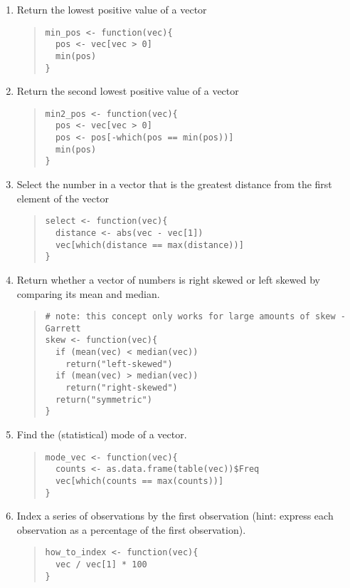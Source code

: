 \documentclass{article}
\begin{document}
\begin{enumerate}
\item Return the lowest positive value of a vector
  \begin{quote}
    \begin{verbatim}
min_pos <- function(vec){
  pos <- vec[vec > 0]
  min(pos)
}    
    \end{verbatim}
  \end{quote}

\item Return the second lowest positive value of a vector
  \begin{quote}
    \begin{verbatim}
min2_pos <- function(vec){
  pos <- vec[vec > 0]
  pos <- pos[-which(pos == min(pos))]
  min(pos)
}
    \end{verbatim}
  \end{quote}

\item Select the number in a vector that is the greatest distance from the first element of the vector
  \begin{quote}
    \begin{verbatim}
select <- function(vec){
  distance <- abs(vec - vec[1])
  vec[which(distance == max(distance))]
}
    \end{verbatim}
  \end{quote}

\item Return whether a vector of numbers is right skewed or left skewed by comparing its mean and median.
  \begin{quote}
    \begin{verbatim}
# note: this concept only works for large amounts of skew - Garrett
skew <- function(vec){
  if (mean(vec) < median(vec))
    return("left-skewed")
  if (mean(vec) > median(vec))
    return("right-skewed")
  return("symmetric")
}
    \end{verbatim}
  \end{quote}

\item Find the (statistical) mode of a vector.
  \begin{quote}
    \begin{verbatim}
mode_vec <- function(vec){
  counts <- as.data.frame(table(vec))$Freq
  vec[which(counts == max(counts))]
}
    \end{verbatim}
  \end{quote}

\item Index a series of observations by the first observation (hint: express each observation as a percentage of the first observation).
  \begin{quote}
    \begin{verbatim}
how_to_index <- function(vec){
  vec / vec[1] * 100
}     
    \end{verbatim}
  \end{quote}


\end{enumerate}
\end{document}
